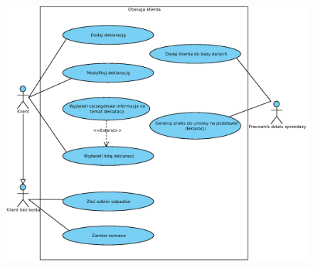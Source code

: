 
\begin{figure}[H]
	\centering
	\includegraphics[width=1.1\textwidth]{img/UC/deklaracje.eps}
\end{figure}

